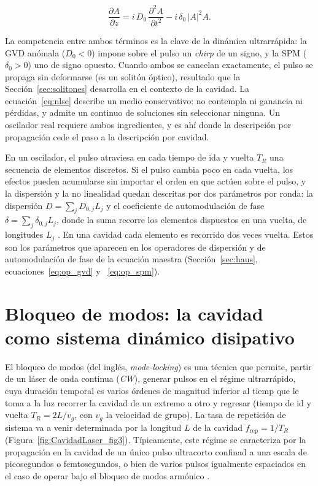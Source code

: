 \begin{equation}
    \frac{\partial A}{\partial z}
    = i\,D_0\,\frac{\partial^2 A}{\partial t^2}
            - i\,\delta_0\,|A|^2 A .
    \label{eq:nlse}
\end{equation}

La competencia entre ambos términos es la clave de la dinámica ultrarrápida: la GVD anómala ($D_0<0$) impone sobre el pulso un \emph{chirp} de un signo, y la SPM ($\delta_0>0$) uno de signo opuesto. Cuando ambos se cancelan exactamente, el pulso se propaga sin deformarse (es un solitón óptico), resultado que la Sección~\ref{sec:solitones} desarrolla en el contexto de la cavidad. La ecuación~\eqref{eq:nlse} describe un medio conservativo: no contempla ni ganancia ni pérdidas, y admite un continuo de soluciones sin seleccionar ninguna. Un oscilador real requiere ambos ingredientes, y es ahí donde la descripción por propagación cede el paso a la descripción por cavidad.

En un oscilador, el pulso atraviesa en cada tiempo de ida y vuelta $T_R$ una secuencia de elementos discretos. Si el pulso cambia poco en cada vuelta, los efectos pueden acumularse sin importar el orden en que actúen sobre el pulso, y la dispersión y la no linealidad quedan descritas por dos parámetros por ronda: la dispersión $D=\sum_j D_{0,j}L_j$ y el coeficiente de automodulación de fase $\delta=\sum_j \delta_{0,j}L_j$, donde la suma recorre los elementos dispuestos en una vuelta, de longitudes $L_j$ \cite[ecs.~4.5 y 4.39]{Keller2022}. En una cavidad cada elemento es recorrido dos veces vuelta. Estos son los parámetros que aparecen en los operadores de dispersión y de automodulación de fase de la ecuación maestra (Sección~\ref{sec:haus}, ecuaciones~\eqref{eq:op_gvd} y ~\eqref{eq:op_spm}).



\section{Bloqueo de modos: la cavidad como sistema dinámico disipativo}
\label{sec:mode_locking}

El bloqueo de modos (del inglés, \emph{mode-locking}) es una técnica que permite,  partir de un láser de onda continua (\emph{CW}), generar pulsos en el régime ultrarrápido, cuya duración temporal es varios órdenes de magnitud inferior al tiemp que le toma a la luz recorrer la cavidad de un extremo a otro y regresar (tiempo de id y vuelta $T_R=2L/v_g$, con $v_g$ la velocidad de grupo). La tasa de repetición de sistema va a venir determinada por la longitud $L$ de la cavidad $f_{\text{rep}}=1/T_R$ (Figura~\ref{fig:CavidadLaser_fig3}). Típicamente, este régime se caracteriza por la propagación en la cavidad de un único pulso ultracorto confinad a una escala de picosegundos o femtosegundos, o bien de varios pulsos igualmente espaciados en el caso de operar bajo el bloqueo de modos armónico \cite[cap.~6]{Keller2022}.

